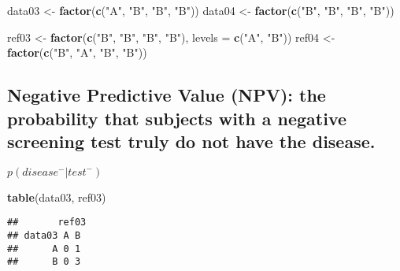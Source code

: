 \documentclass[]{article}
\newenvironment{Shaded}{\begin{snugshade}}{\end{snugshade}}
\newcommand{\CommentTok}[1]{\textcolor[rgb]{0.56,0.35,0.01}{\textit{#1}}}
\newcommand{\DataTypeTok}[1]{\textcolor[rgb]{0.13,0.29,0.53}{#1}}
\newcommand{\KeywordTok}[1]{\textcolor[rgb]{0.13,0.29,0.53}{\textbf{#1}}}
\newcommand{\NormalTok}[1]{#1}
\newcommand{\StringTok}[1]{\textcolor[rgb]{0.31,0.60,0.02}{#1}}
\begin{document}
\begin{Shaded}
\begin{Highlighting}[]
\NormalTok{data03 <-}\StringTok{ }\KeywordTok{factor}\NormalTok{(}\KeywordTok{c}\NormalTok{(}\StringTok{"A"}\NormalTok{, }\StringTok{"B"}\NormalTok{, }\StringTok{"B"}\NormalTok{, }\StringTok{"B"}\NormalTok{))}
\NormalTok{data04 <-}\StringTok{ }\KeywordTok{factor}\NormalTok{(}\KeywordTok{c}\NormalTok{(}\StringTok{"B"}\NormalTok{, }\StringTok{"B"}\NormalTok{, }\StringTok{"B"}\NormalTok{, }\StringTok{"B"}\NormalTok{))}

\NormalTok{ref03 <-}\StringTok{ }\KeywordTok{factor}\NormalTok{(}\KeywordTok{c}\NormalTok{(}\StringTok{"B"}\NormalTok{, }\StringTok{"B"}\NormalTok{, }\StringTok{"B"}\NormalTok{, }\StringTok{"B"}\NormalTok{), }\DataTypeTok{levels =} \KeywordTok{c}\NormalTok{(}\StringTok{"A"}\NormalTok{, }\StringTok{"B"}\NormalTok{))}
\NormalTok{ref04 <-}\StringTok{ }\KeywordTok{factor}\NormalTok{(}\KeywordTok{c}\NormalTok{(}\StringTok{"B"}\NormalTok{, }\StringTok{"A"}\NormalTok{, }\StringTok{"B"}\NormalTok{, }\StringTok{"B"}\NormalTok{))}
\end{Highlighting}
\end{Shaded}

\hypertarget{negative-predictive-value-npv-the-probability-that-subjects-with-a-negative-screening-test-truly-do-not-have-the-disease.}{%
\subsection{Negative Predictive Value (NPV): the probability that
subjects with a negative screening test truly do not have the
disease.}\label{negative-predictive-value-npv-the-probability-that-subjects-with-a-negative-screening-test-truly-do-not-have-the-disease.}}

\(p(disease^-|test^-)\)

\begin{Shaded}
\begin{Highlighting}[]
\KeywordTok{table}\NormalTok{(data03, ref03)}
\end{Highlighting}
\end{Shaded}

\begin{verbatim}
##       ref03
## data03 A B
##      A 0 1
##      B 0 3
\end{verbatim}

\begin{Shaded}
\end{Shaded}
\end{document}
